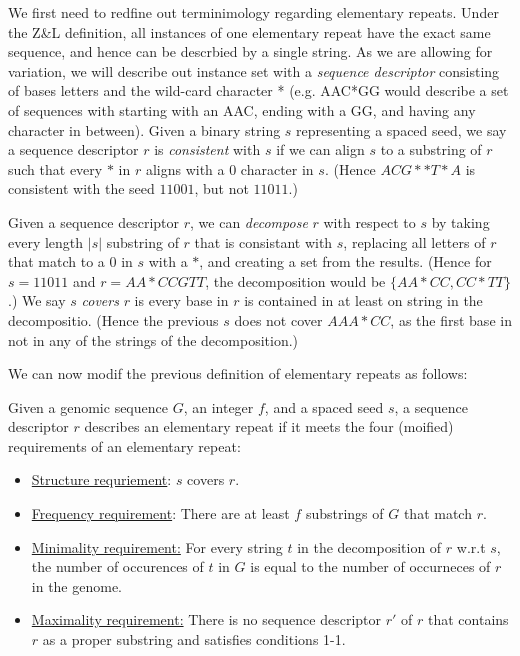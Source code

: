 \documentclass{bmcart}
\begin{document}
We first need to redfine out terminimology regarding elementary
repeats.  Under the Z\&L definition, all instances of one elementary
repeat have the exact same sequence, and hence can be descrbied by a
single string.  As we are allowing for variation, we will describe out
instance set with a {\it sequence descriptor} consisting of bases
letters and the wild-card character * (e.g. AAC*GG would describe a
set of sequences with starting with an AAC, ending with a GG, and
having any character in between).  Given a binary string $s$
representing a spaced seed, we say a sequence descriptor $r$ is
{\it consistent} with $s$ if we can align $s$ to a substring of $r$ such
that every $*$ in $r$ aligns with a $0$ character in $s$. (Hence
$ACG**T*A$ is consistent with the seed $11001$, but not $11011$.) 

Given a sequence descriptor $r$, we can {\it decompose} $r$ with
respect to $s$ by taking every length $|s|$ substring of $r$ that is consistant
with $s$, replacing all letters of $r$ that match to a 0 in $s$ with a
$*$, and creating a set from the results.  (Hence for $s = 11011$ and
$r=AA*CCGTT$, the decomposition would be $\{AA*CC, CC*TT\}$.)  We say
$s$ {\it covers} $r$ is every base in $r$ is contained in at least on
string in the decompositio.  (Hence the previous $s$ does not cover $AAA*CC$, as
the first base in not in any of the strings of the decomposition.)


We can now modif the previous definition of elementary repeats as
follows:
\begin{definition} Given a genomic sequence $G$, an integer $f$, and a
  spaced seed $s$, a sequence descriptor $r$ describes an elementary
  repeat if it meets the four (moified) requirements of an elementary repeat:
\begin{itemize}
\item \underline{Structure requriement}: $s$ covers $r$.
\item \underline{Frequency requirement}: There are at least $f$
  substrings of $G$ that match $r$.
\item \underline{Minimality requirement:} For every string $t$ in the
  decomposition of $r$ w.r.t $s$, the number of occurences of $t$ in
  $G$ is equal to the number of occurneces of $r$ in the genome.
\item \underline{Maximality requirement:} There is no sequence
  descriptor $r'$ of $r$ that contains $r$ as a proper substring and
  satisfies conditions 1-1.
\end{itemize}
\end{definition}
\end{document}
